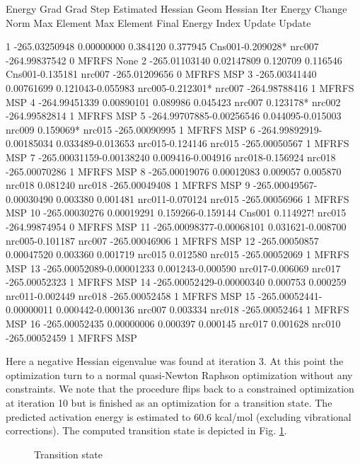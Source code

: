 \begin{sourcelisting}
                      Energy     Grad     Grad          Step           Estimated  Hessian Geom Hessian
Iter     Energy       Change     Norm      Max  Element  Max  Element  Final Energy Index Update Update

 1   -265.03250948 0.00000000 0.384120 0.377945 Cns001-0.209028* nrc007 -264.99837542 0  MFRFS   None
 2   -265.01103140 0.02147809 0.120709 0.116546 Cns001-0.135181  nrc007 -265.01209656 0  MFRFS   MSP
 3   -265.00341440 0.00761699 0.121043-0.055983 nrc005-0.212301* nrc007 -264.98788416 1  MFRFS   MSP
 4   -264.99451339 0.00890101 0.089986 0.045423 nrc007 0.123178* nrc002 -264.99582814 1  MFRFS   MSP
 5   -264.99707885-0.00256546 0.044095-0.015003 nrc009 0.159069* nrc015 -265.00090995 1  MFRFS   MSP
 6   -264.99892919-0.00185034 0.033489-0.013653 nrc015-0.124146  nrc015 -265.00050567 1  MFRFS   MSP
 7   -265.00031159-0.00138240 0.009416-0.004916 nrc018-0.156924  nrc018 -265.00070286 1  MFRFS   MSP
 8   -265.00019076 0.00012083 0.009057 0.005870 nrc018 0.081240  nrc018 -265.00049408 1  MFRFS   MSP
 9   -265.00049567-0.00030490 0.003380 0.001481 nrc011-0.070124  nrc015 -265.00056966 1  MFRFS   MSP
10   -265.00030276 0.00019291 0.159266-0.159144 Cns001 0.114927! nrc015 -264.99874954 0  MFRFS   MSP
11   -265.00098377-0.00068101 0.031621-0.008700 nrc005-0.101187  nrc007 -265.00046906 1  MFRFS   MSP
12   -265.00050857 0.00047520 0.003360 0.001719 nrc015 0.012580  nrc015 -265.00052069 1  MFRFS   MSP
13   -265.00052089-0.00001233 0.001243-0.000590 nrc017-0.006069  nrc017 -265.00052323 1  MFRFS   MSP
14   -265.00052429-0.00000340 0.000753 0.000259 nrc011-0.002449  nrc018 -265.00052458 1  MFRFS   MSP
15   -265.00052441-0.00000011 0.000442-0.000136 nrc007 0.003334  nrc018 -265.00052464 1  MFRFS   MSP
16   -265.00052435 0.00000006 0.000397 0.000145 nrc017 0.001628  nrc010 -265.00052459 1  MFRFS   MSP
\end{sourcelisting}

Here a negative Hessian eigenvalue was found at iteration 3. At this point the optimization turn to a normal
quasi-Newton Raphson optimization without any constraints. We note that the procedure flips back to a constrained
optimization at iteration 10 but is finished as an optimization for a transition state. 
The predicted activation energy is estimated to 60.6 kcal/mol  (excluding vibrational corrections). 
The computed transition state
is depicted in Fig. \ref{fig:job3}.

\begin{figure}[hp]
\caption{\label{fig:job3}Transition state}
\end{figure}

